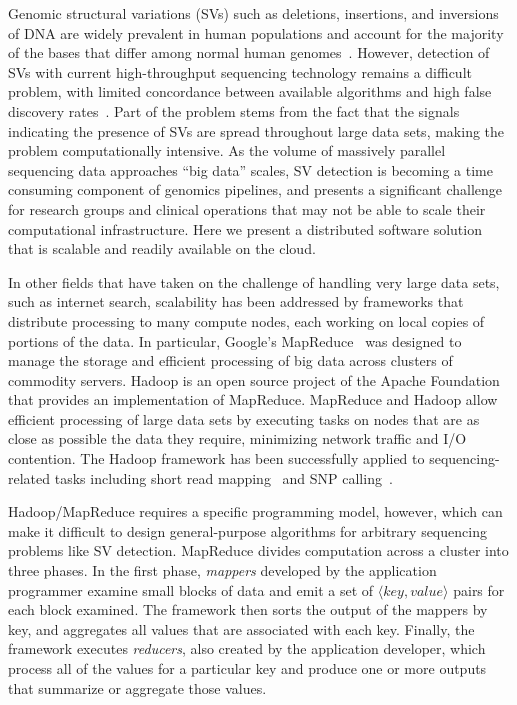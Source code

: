 \documentclass{bioinfo}
\newcommand{\todo}[1]{}
\begin{document}
Genomic structural variations (SVs) such as deletions, insertions, and inversions of DNA are widely prevalent in human populations and account for the majority of the bases that differ among normal human genomes~\citep{Mills:2011p1611, Conrad:2010ja}. However, detection of SVs with current high-throughput sequencing technology remains a difficult problem, with limited concordance between available algorithms and high false discovery rates~\citep{Mills:2011p1611}. Part of the problem stems from the fact that the signals indicating the presence of SVs are spread throughout large data sets, making the problem computationally intensive. As the volume of massively parallel sequencing data approaches ``big data'' scales, SV detection is becoming a time consuming component of genomics pipelines, and presents a significant challenge for research groups and clinical operations that may not be able to scale their computational infrastructure. Here we present a distributed software solution that is scalable and readily available on the cloud.

In other fields that have taken on the challenge of handling very large data sets, such as internet search, scalability has been addressed by frameworks that distribute processing to many compute nodes, each working on local copies of portions of the data. In particular, Google's MapReduce~\citep{Dean:2008p277} was designed to manage the storage and efficient processing of big data across clusters of commodity servers. Hadoop is an open source project of the Apache Foundation that provides an implementation of MapReduce. MapReduce and Hadoop allow efficient processing of large data sets by executing tasks on nodes that are as close as possible the data they require, minimizing network traffic and I/O contention. The Hadoop framework has been successfully applied to sequencing-related tasks including short read mapping~\citep{Schatz:2009p278} and SNP calling~\citep{Langmead:2009p1225}\todo{, and RNA-seq differential expression analysis~\citep{Langmead:2010p1268}}.

Hadoop/MapReduce requires a specific programming model, however, which can make it difficult to design general-purpose algorithms for arbitrary sequencing problems like SV detection. MapReduce divides computation across a cluster into three phases. In the first phase, \emph{mappers} developed by the application programmer examine small blocks of data and emit a set of $\langle key, value \rangle$ pairs for each block examined. The framework then sorts the output of the mappers by key, and aggregates all values that are associated with each key. Finally, the framework executes \emph{reducers}, also created by the application developer, which process all of the values for a particular key and produce one or more outputs that summarize or aggregate those values.
\end{document}
